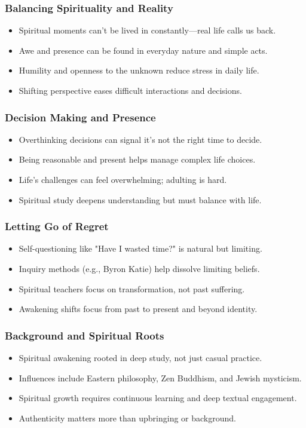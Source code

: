\begin{frame}[fragile]\frametitle{Balancing Spirituality and Reality}
  \begin{itemize}
    \item Spiritual moments can’t be lived in constantly—real life calls us back.
    \item Awe and presence can be found in everyday nature and simple acts.
    \item Humility and openness to the unknown reduce stress in daily life.
    \item Shifting perspective eases difficult interactions and decisions.
  \end{itemize}
\end{frame}

\begin{frame}[fragile]\frametitle{Decision Making and Presence}
  \begin{itemize}
    \item Overthinking decisions can signal it’s not the right time to decide.
    \item Being reasonable and present helps manage complex life choices.
    \item Life’s challenges can feel overwhelming; adulting is hard.
    \item Spiritual study deepens understanding but must balance with life.
  \end{itemize}
\end{frame}

\begin{frame}[fragile]\frametitle{Letting Go of Regret}
  \begin{itemize}
    \item Self-questioning like "Have I wasted time?" is natural but limiting.
    \item Inquiry methods (e.g., Byron Katie) help dissolve limiting beliefs.
    \item Spiritual teachers focus on transformation, not past suffering.
    \item Awakening shifts focus from past to present and beyond identity.
  \end{itemize}
\end{frame}

\begin{frame}[fragile]\frametitle{Background and Spiritual Roots}
  \begin{itemize}
    \item Spiritual awakening rooted in deep study, not just casual practice.
    \item Influences include Eastern philosophy, Zen Buddhism, and Jewish mysticism.
    \item Spiritual growth requires continuous learning and deep textual engagement.
    \item Authenticity matters more than upbringing or background.
  \end{itemize}
\end{frame}

